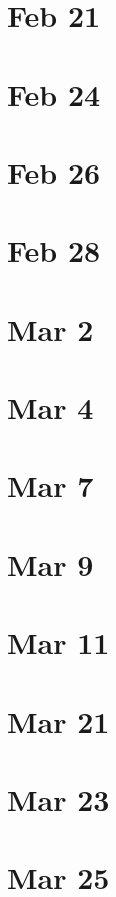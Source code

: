 \documentclass{amsart}
\newcommand{\<}{\langle}
\renewcommand{\>}{\rangle}
\theoremstyle{plain}
\theoremstyle{definition}
\theoremstyle{remark}
\begin{document}
\section{Feb 21}

\section{Feb 24}

\section{Feb 26}

\section{Feb 28}

\section{Mar 2}

\section{Mar 4}

\section{Mar 7}

\section{Mar 9}

\section{Mar 11}

\section{Mar 21}

\section{Mar 23}

\section{Mar 25}
\end{document}
